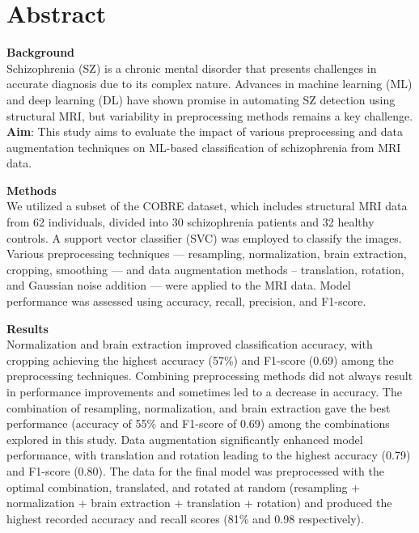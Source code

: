 



\maketitle

\section{Abstract}

\tab\textbf{Background}\\
Schizophrenia (SZ) is a chronic mental disorder that presents challenges in accurate diagnosis due to its complex nature. Advances in machine learning (ML) and deep learning (DL) have shown promise in automating SZ detection using structural MRI, but variability in preprocessing methods remains a key challenge.
\textbf{Aim}: This study aims to evaluate the impact of various preprocessing and data augmentation techniques on ML-based classification of schizophrenia from MRI data.

\textbf{Methods}\\
We utilized a subset of the COBRE dataset, which includes structural MRI data from 62 individuals, divided into 30 schizophrenia patients and 32 healthy controls. A support vector classifier (SVC) was employed to classify the images. Various preprocessing techniques --- resampling, normalization, brain extraction, cropping, smoothing --- and data augmentation methods -- translation, rotation, and Gaussian noise addition --- were applied to the MRI data. Model performance was assessed using accuracy, recall, precision, and F1-score.

\textbf{Results}\\
Normalization and brain extraction improved classification accuracy, with cropping achieving the highest accuracy (57\%) and F1-score (0.69) among the preprocessing techniques. Combining preprocessing methods did not always result in performance improvements and sometimes led to a decrease in accuracy. The combination of resampling, normalization, and brain extraction gave the best performance (accuracy of 55\% and F1-score of 0.69) among the combinations explored in this study. Data augmentation significantly enhanced model performance, with translation and rotation leading to the highest accuracy (0.79) and F1-score (0.80). The data for the final model was preprocessed with the optimal combination, translated, and rotated at random (resampling + normalization + brain extraction + translation + rotation) and produced the highest recorded accuracy and recall scores (81\% and 0.98 respectively).

